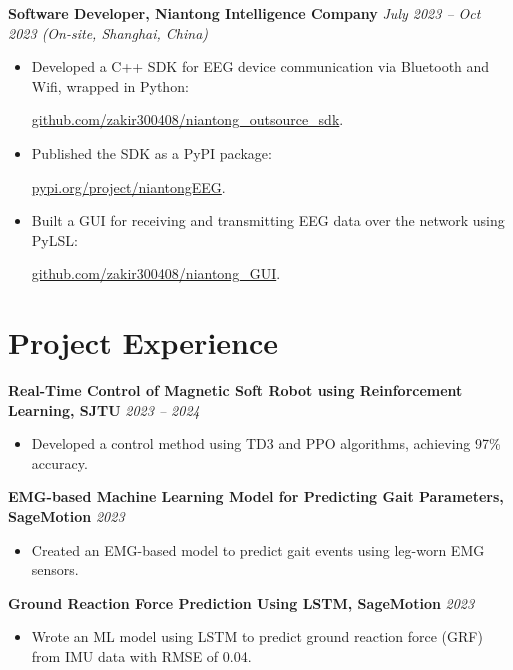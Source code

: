 \documentclass[10pt,a4paper]{article}
\begin{document}
	\textbf{Software Developer, Niantong Intelligence Company} \hfill \textit{July 2023 -- Oct 2023 (On-site, Shanghai, China)} \\
	\begin{itemize}[left=0pt, nosep]
		\item Developed a C++ SDK for EEG device communication via Bluetooth and Wifi, wrapped in Python:
		
		 \href{https://github.com/zakir300408/niantong_outsource_sdk}{github.com/zakir300408/niantong\_outsource\_sdk}.
		\item Published the SDK as a PyPI package:
		
		 \href{https://pypi.org/project/niantongEEG/}{pypi.org/project/niantongEEG}.
		\item Built a GUI for receiving and transmitting EEG data over the network using PyLSL:
		
		 \href{https://github.com/zakir300408/niantong_GUI}{github.com/zakir300408/niantong\_GUI}.
	\end{itemize}
	
	
	\section{Project Experience}
	\textbf{Real-Time Control of Magnetic Soft Robot using Reinforcement Learning, SJTU} \hfill \textit{2023 -- 2024} \\
	\begin{itemize}[left=0pt, nosep]
		\item Developed a control method using TD3 and PPO algorithms, achieving 97\% accuracy.
	\end{itemize}
	
	\textbf{EMG-based Machine Learning Model for Predicting Gait Parameters, SageMotion} \hfill \textit{2023} \\
	\begin{itemize}[left=0pt, nosep]
		\item Created an EMG-based model to predict gait events using leg-worn EMG sensors.
	\end{itemize}
	
	\textbf{Ground Reaction Force Prediction Using LSTM, SageMotion} \hfill \textit{2023} \\
	\begin{itemize}[left=0pt, nosep]
		\item Wrote an ML model using LSTM to predict ground reaction force (GRF) from IMU data with RMSE of 0.04.
	\end{itemize}
	
\end{document}
